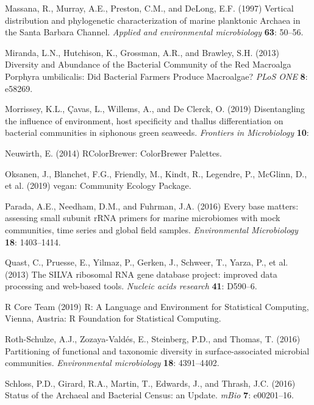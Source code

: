 \documentclass[12pt,]{article}
\begin{document}
\leavevmode\hypertarget{ref-Massana1997}{}%
Massana, R., Murray, A.E., Preston, C.M., and DeLong, E.F. (1997)
Vertical distribution and phylogenetic characterization of marine
planktonic Archaea in the Santa Barbara Channel. \emph{Applied and
environmental microbiology} \textbf{63}: 50--56.

\leavevmode\hypertarget{ref-Miranda2013}{}%
Miranda, L.N., Hutchison, K., Grossman, A.R., and Brawley, S.H. (2013)
Diversity and Abundance of the Bacterial Community of the Red Macroalga
Porphyra umbilicalis: Did Bacterial Farmers Produce Macroalgae?
\emph{PLoS ONE} \textbf{8}: e58269.

\leavevmode\hypertarget{ref-Morrissey2019}{}%
Morrissey, K.L., Çavas, L., Willems, A., and De Clerck, O. (2019)
Disentangling the influence of environment, host specificity and thallus
differentiation on bacterial communities in siphonous green seaweeds.
\emph{Frontiers in Microbiology} \textbf{10}:

\leavevmode\hypertarget{ref-Neuwirth2014}{}%
Neuwirth, E. (2014) RColorBrewer: ColorBrewer Palettes.

\leavevmode\hypertarget{ref-Oksanen2019}{}%
Oksanen, J., Blanchet, F.G., Friendly, M., Kindt, R., Legendre, P.,
McGlinn, D., et al. (2019) vegan: Community Ecology Package.

\leavevmode\hypertarget{ref-Parada2016}{}%
Parada, A.E., Needham, D.M., and Fuhrman, J.A. (2016) Every base
matters: assessing small subunit rRNA primers for marine microbiomes
with mock communities, time series and global field samples.
\emph{Environmental Microbiology} \textbf{18}: 1403--1414.

\leavevmode\hypertarget{ref-Quast2013}{}%
Quast, C., Pruesse, E., Yilmaz, P., Gerken, J., Schweer, T., Yarza, P.,
et al. (2013) The SILVA ribosomal RNA gene database project: improved
data processing and web-based tools. \emph{Nucleic acids research}
\textbf{41}: D590--6.

\leavevmode\hypertarget{ref-RCoreTeam2019}{}%
R Core Team (2019) R: A Language and Environment for Statistical
Computing, Vienna, Austria: R Foundation for Statistical Computing.

\leavevmode\hypertarget{ref-Roth-Schulze2016}{}%
Roth-Schulze, A.J., Zozaya-Valdés, E., Steinberg, P.D., and Thomas, T.
(2016) Partitioning of functional and taxonomic diversity in
surface-associated microbial communities. \emph{Environmental
microbiology} \textbf{18}: 4391--4402.

\leavevmode\hypertarget{ref-Schloss2016}{}%
Schloss, P.D., Girard, R.A., Martin, T., Edwards, J., and Thrash, J.C.
(2016) Status of the Archaeal and Bacterial Census: an Update.
\emph{mBio} \textbf{7}: e00201--16.
\end{document}

